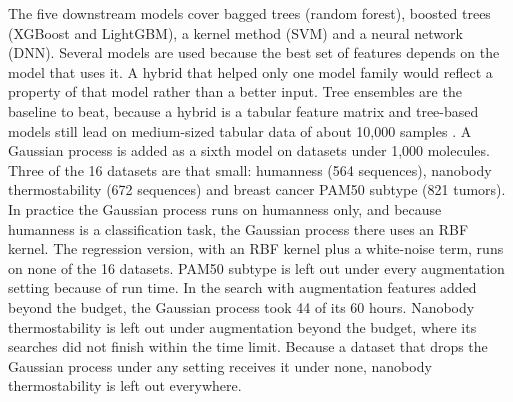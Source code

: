 The five downstream models cover bagged trees (random forest), boosted trees (XGBoost and LightGBM), a kernel method (SVM) and a neural network (DNN). Several models are used because the best set of features depends on the model that uses it. A hybrid that helped only one model family would reflect a property of that model rather than a better input. Tree ensembles are the baseline to beat, because a hybrid is a tabular feature matrix and tree-based models still lead on medium-sized tabular data of about 10,000 samples \citep{Grinsztajn2022}. A Gaussian process \citep{Rasmussen2006} is added as a sixth model on datasets under 1,000 molecules. Three of the 16 datasets are that small: humanness (564 sequences), nanobody thermostability (672 sequences) and breast cancer PAM50 subtype (821 tumors). In practice the Gaussian process runs on humanness only, and because humanness is a classification task, the Gaussian process there uses an RBF kernel. The regression version, with an RBF kernel plus a white-noise term, runs on none of the 16 datasets. PAM50 subtype is left out under every augmentation setting because of run time. In the search with augmentation features added beyond the budget, the Gaussian process took 44 of its 60 hours. Nanobody thermostability is left out under augmentation beyond the budget, where its searches did not finish within the time limit. Because a dataset that drops the Gaussian process under any setting receives it under none, nanobody thermostability is left out everywhere.

